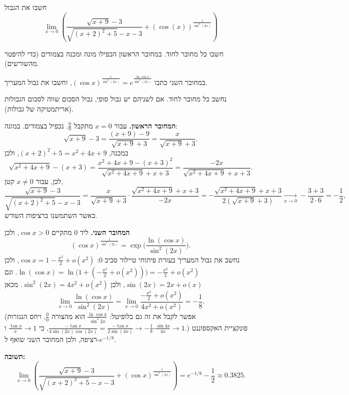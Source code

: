 
\begin{question}
חשבו את הגבול
\[ \lim_{x\to 0}\left(\frac{\sqrt{x+9}-3}{\sqrt{(x+2)^2+5}-x-3}+(\cos(x))^{\frac{1}{\sin^2(2x)}}\right) \]
\end{question}

\begin{hint}
חשבו כל מחובר לחוד. במחובר הראשון הכפילו מונה ומכנה בצמודים (כדי להיפטר מהשורשים).
\end{hint}

\begin{hint}
במחובר השני כתבו $(\cos x)^{\frac{1}{\sin^2(2x)}}=e^{\frac{\ln\cos x}{\sin^2(2x)}}$, וחשבו את גבול המעריך.
\end{hint}

\begin{solution}
נחשב כל מחובר לחוד. אם לשניהם יש גבול סופי, גבול הסכום שווה לסכום הגבולות (אריתמטיקה של גבולות).

\textbf{המחובר הראשון.} עבור $x=0$ מתקבל $\frac{0}{0}$. נכפיל בצמודים. במונה:
\[ \sqrt{x+9}-3=\frac{(x+9)-9}{\sqrt{x+9}+3}=\frac{x}{\sqrt{x+9}+3}. \]
במכנה, $(x+2)^2+5=x^2+4x+9$, ולכן
\[ \sqrt{x^2+4x+9}-(x+3)=\frac{x^2+4x+9-(x+3)^2}{\sqrt{x^2+4x+9}+x+3}=\frac{-2x}{\sqrt{x^2+4x+9}+x+3}. \]
לכן, עבור $x\neq0$ קטן,
\[ \frac{\sqrt{x+9}-3}{\sqrt{(x+2)^2+5}-x-3}=\frac{x}{\sqrt{x+9}+3}\cdot\frac{\sqrt{x^2+4x+9}+x+3}{-2x}
=-\frac{\sqrt{x^2+4x+9}+x+3}{2(\sqrt{x+9}+3)}\xrightarrow[x\to0]{}-\frac{3+3}{2\cdot 6}=-\frac12 , \]
כאשר השתמשנו ברציפות השורש.

\textbf{המחובר השני.} ליד $0$ מתקיים $\cos x>0$, ולכן
\[ (\cos x)^{\frac{1}{\sin^2(2x)}}=\exp\Big(\frac{\ln(\cos x)}{\sin^2(2x)}\Big). \]
נחשב את גבול המעריך בעזרת פיתוחי טיילור סביב $0$:
$\cos x=1-\frac{x^2}{2}+o(x^2)$, ולכן $\ln(\cos x)=\ln\big(1+(-\frac{x^2}{2}+o(x^2))\big)=-\frac{x^2}{2}+o(x^2)$.
וגם $\sin(2x)=2x+o(x)$, ולכן $\sin^2(2x)=4x^2+o(x^2)$. מכאן
\[ \lim_{x\to0}\frac{\ln(\cos x)}{\sin^2(2x)}=\lim_{x\to0}\frac{-\frac{x^2}{2}+o(x^2)}{4x^2+o(x^2)}=-\frac18 . \]
(אפשר לקבל את זה גם בלופיטל: $\frac{\ln\cos x}{\sin^2 2x}$ הוא מהצורה $\frac00$, ויחס הנגזרות $\frac{-\tan x}{4\sin(2x)\cos(2x)}=\frac{-\tan x}{2\sin(4x)}\to -\frac{1}{8}$, כי $\frac{\tan x}{x}\to1$ ו-$\frac{\sin 4x}{4x}\to 1$.)
פונקציית האקספוננט רציפה, ולכן המחובר השני שואף ל-$e^{-1/8}$.

\textbf{תשובה:}
\[ \lim_{x\to 0}\left(\frac{\sqrt{x+9}-3}{\sqrt{(x+2)^2+5}-x-3}+(\cos x)^{\frac{1}{\sin^2(2x)}}\right)=\boxed{e^{-1/8}-\frac12}\approx 0.3825 . \]
\end{solution}
